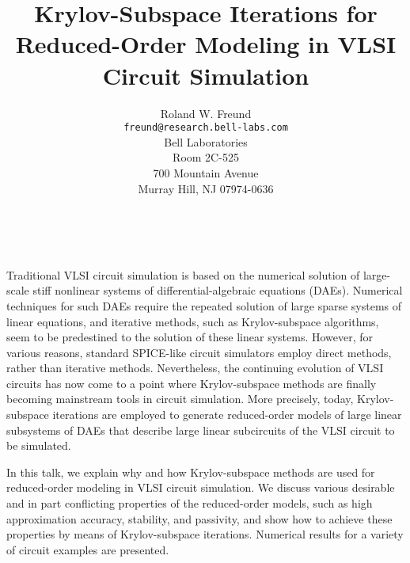 \documentclass[11pt]{article}
\date{ ~ \hspace{-4mm}}
\title{Krylov-Subspace Iterations for Reduced-Order Modeling  \newline  in VLSI Circuit Simulation  }
\author{Roland W. Freund \\ {\tt freund@research.bell-labs.com} \\ Bell Laboratories  \\  Room 2C-525  \\  700 Mountain Avenue  \\  Murray Hill, NJ 07974-0636}
\begin{document}
\maketitle
\thispagestyle{empty}





 



Traditional VLSI circuit simulation is based on the numerical 
solution of large-scale stiff nonlinear systems of 
differential-algebraic equations (DAEs).  Numerical techniques 
for such DAEs require the repeated solution of large sparse 
systems of linear equations, and iterative methods, such as 
Krylov-subspace algorithms, seem to be predestined to the 
solution of these linear systems.  However, for various reasons, 
standard SPICE-like circuit simulators employ direct methods, 
rather than iterative methods.  Nevertheless, the continuing 
evolution of VLSI circuits has now come to a point where 
Krylov-subspace methods are finally becoming mainstream tools
in circuit simulation.  More precisely, today, Krylov-subspace 
iterations are employed to generate reduced-order models of large 
linear subsystems of DAEs that describe large linear subcircuits of
the VLSI circuit to be simulated.




In this talk, we explain why and how Krylov-subspace methods 
are used for reduced-order modeling in VLSI circuit simulation.
We discuss various desirable and in part conflicting properties
of the reduced-order models, such as high approximation
accuracy, stability, and passivity, and show how to achieve 
these properties by means of Krylov-subspace iterations.
Numerical results for a variety of circuit examples are
presented.
\end{document}
